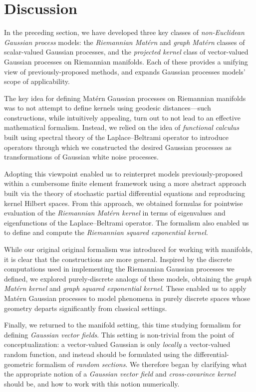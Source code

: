 \documentclass[11pt]{book}
\begin{document}
\section{Discussion}
\label{sec:noneuclidean-discussion}

In the preceding section, we have developed three key classes of \emph{non-Euclidean Gaussian process} models: the \emph{Riemannian Matérn} and \emph{graph Matérn} classes of scalar-valued Gaussian processes, and the \emph{projected kernel} class of vector-valued Gaussian processes on Riemannian manifolds.
Each of these provides a unifying view of previously-proposed methods, and expands Gaussian processes models' scope of applicability.

The key idea for defining Matérn Gaussian processes on Riemannian manifolds was to not attempt to define kernels using geodesic distances---such constructions, while intuitively appealing, turn out to not lead to an effective mathematical formalism.
Instead, we relied on the idea of \emph{functional calculus} built using spectral theory of the Laplace--Beltrami operator to introduce operators through which we constructed the desired Gaussian processes as transformations of Gaussian white noise processes.

Adopting this viewpoint enabled us to reinterpret models previously-proposed within a cumbersome finite element framework using a more abstract approach built via the theory of stochastic partial differential equations and reproducing kernel Hilbert spaces.
From this approach, we obtained formulas for pointwise evaluation of the \emph{Riemannian Matérn kernel} in terms of eigenvalues and eigenfunctions of the Laplace--Beltrami operator.
The formalism also enabled us to define and compute the \emph{Riemannian squared exponential kernel}.

While our original original formalism was introduced for working with manifolds, it is clear that the constructions are more general.
Inspired by the discrete computations used in implementing the Riemannian Gaussian processes we defined, we explored purely-discrete analogs of these models, obtaining the \emph{graph Matérn kernel} and \emph{graph squared exponential kernel}.
These enabled us to apply Matérn Gaussian processes to model phenomena in purely discrete spaces whose geometry departs significantly from classical settings.

Finally, we returned to the manifold setting, this time studying formalism for defining \emph{Gaussian vector fields}.
This setting is non-trivial from the point of conceptualization: a vector-valued Gaussian is only \emph{locally} a vector-valued random function, and instead should be formulated using the differential-geometric formalism of \emph{random sections}.
We therefore began by clarifying what the appropriate notion of a \emph{Gaussian vector field}  and \emph{cross-covarince kernel} should be, and how to work with this notion numerically.
\end{document}
